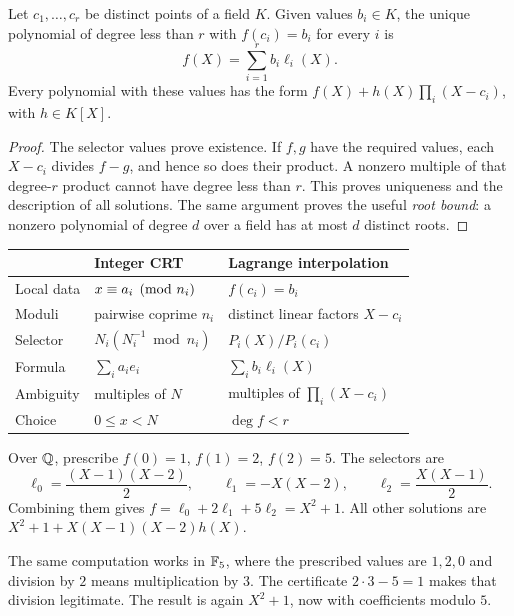 \begin{theorem}
Let $c_1,\ldots,c_r$ be distinct points of a field $K$.
Given values $b_i\in K$, the unique polynomial of degree less than $r$
with $f(c_i)=b_i$ for every $i$ is
\[
 f(X)=\sum_{i=1}^r b_i\ell_i(X).
\]
Every polynomial with these values has the form
$f(X)+h(X)\prod_i(X-c_i)$, with $h\in K[X]$.
\end{theorem}

\begin{proof}
The selector values prove existence. If $f,g$ have the required values,
each $X-c_i$ divides $f-g$, and hence so does their product. A nonzero
multiple of that degree-$r$ product cannot have degree less than $r$.
This proves uniqueness and the description of all solutions.
The same argument proves the useful \emph{root bound}: a nonzero
polynomial of degree $d$ over a field has at most $d$ distinct roots.
\end{proof}

\begin{center}
\small
\begin{tabularx}{\textwidth}{p{}XX}
\toprule
 & Integer CRT & Lagrange interpolation \\
\midrule
Local data & $x\equiv a_i\pmod{n_i}$ & $f(c_i)=b_i$ \\
Moduli & pairwise coprime $n_i$ & distinct linear factors $X-c_i$ \\
Selector & $N_i(N_i^{-1}\bmod n_i)$ & $P_i(X)/P_i(c_i)$ \\
Formula & $\sum_i a_i e_i$ & $\sum_i b_i\ell_i(X)$ \\
Ambiguity & multiples of $N$ & multiples of $\prod_i(X-c_i)$ \\
Choice & $0\le x<N$ & $\deg f<r$ \\
\bottomrule
\end{tabularx}
\end{center}

\begin{example}
Over $\mathbb Q$, prescribe $f(0)=1$, $f(1)=2$, $f(2)=5$. The selectors are
\[
 \ell_0=\frac{(X-1)(X-2)}2,\qquad
 \ell_1=-X(X-2),\qquad
 \ell_2=\frac{X(X-1)}2.
\]
Combining them gives $f=\ell_0+2\ell_1+5\ell_2=X^2+1$.
All other solutions are $X^2+1+X(X-1)(X-2)h(X)$.

The same computation works in $\mathbb F_5$, where the prescribed values are
$1,2,0$ and division by $2$ means multiplication by $3$.
The certificate $2\cdot3-5=1$ makes that division legitimate.
The result is again $X^2+1$, now with coefficients modulo $5$.
\end{example}

